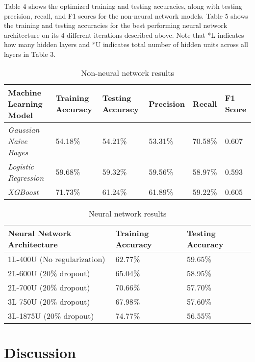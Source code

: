 \documentclass{article}
\begin{document}
Table 4 shows the optimized training and testing accuracies, along with testing precision, recall, and F1 scores for the non-neural network models. Table 5 shows the training and testing accuracies for the best performing neural network architecture on its 4 different iterations described above. Note that *L indicates how many hidden layers and *U indicates total number of hidden units across all layers in Table 3.  

\begin{table}[h]
    \caption{Non-neural network results}
    \label{table2}
    \centering
    \begin{tabular}{llllll}
    \toprule
    \textbf{Machine Learning Model} & \textbf{Training Accuracy} & \textbf{Testing Accuracy} & \textbf{Precision} & \textbf{Recall} & \textbf{F1 Score} \\ 
    \midrule
    \textit{Gaussian Naive Bayes} & 54.18\% & 54.21\% & 53.31\% & 70.58\% & 0.607 \\ 
    \midrule
    \textit{Logistic Regression} & 59.68\% & 59.32\% & 59.56\% & 58.97\% & 0.593 \\ 
    \midrule
    \textit{XGBoost} & 71.73\% & 61.24\% & 61.89\% & 59.22\% & 0.605 \\ \bottomrule
   \end{tabular}
\end{table}

\begin{table}[h]
    \caption{Neural network results}
    \label{table3}
    \centering
    \begin{tabular}{lll}
    \toprule
    \textbf{Neural Network Architecture} & \textbf{Training Accuracy} & \textbf{Testing Accuracy} \\ 
    \midrule
    1L-400U (No regularization) & 62.77\% & 59.65\% \\ 
    \midrule
    2L-600U (20\% dropout) & 65.04\% & 58.95\% \\ 
    \midrule
    2L-700U (20\% dropout) & 70.66\% & 57.70\% \\ 
    \midrule
    3L-750U (20\% dropout) & 67.98\% & 57.60\% \\ 
    \midrule
    3L-1875U (20\% dropout) & 74.77\% & 56.55\% \\ \bottomrule
  \end{tabular}
\end{table}

\section{Discussion}
\end{document}
